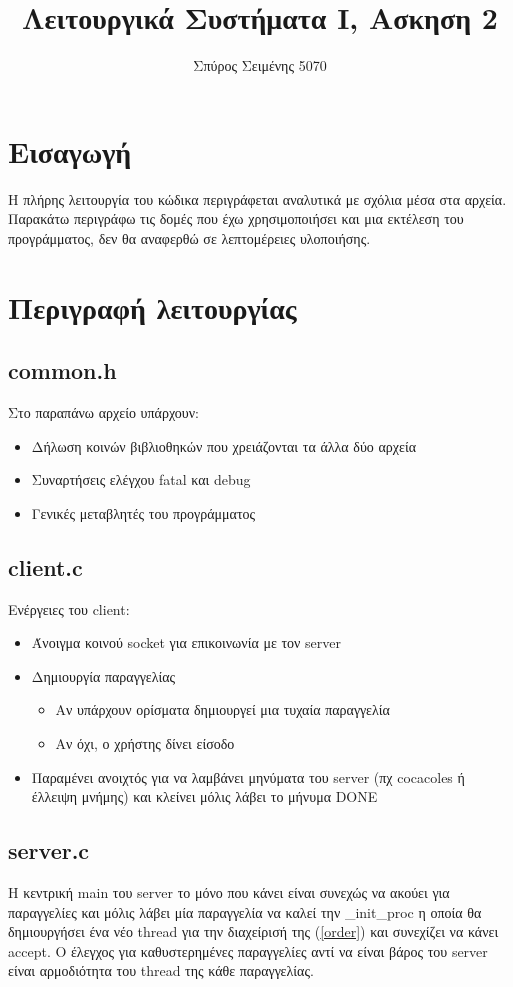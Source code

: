 \documentclass{article}
\title{Λειτουργικά Συστήματα Ι, Ασκηση 2}
\author{Σπύρος Σειμένης 5070}
\begin{document}
\maketitle

\section{Εισαγωγή}
Η πλήρης λειτουργία του κώδικα περιγράφεται αναλυτικά με σχόλια μέσα στα αρχεία. Παρακάτω περιγράφω τις δομές που έχω χρησιμοποιήσει και μια εκτέλεση του προγράμματος, δεν θα αναφερθώ σε λεπτομέρειες υλοποιήσης.

\section{Περιγραφή λειτουργίας}
\subsection{common.h}
Στο παραπάνω αρχείο υπάρχουν:
\begin{itemize}
 \item Δήλωση κοινών βιβλιοθηκών που χρειάζονται τα άλλα δύο αρχεία
 \item Συναρτήσεις ελέγχου fatal και debug
 \item Γενικές μεταβλητές του προγράμματος
\end{itemize}

\subsection{client.c}
Ενέργειες του client:
\begin{itemize}
 \item Άνοιγμα κοινού socket για επικοινωνία με τον server
 \item Δημιουργία παραγγελίας
 \begin{itemize}
 \item Αν υπάρχουν ορίσματα δημιουργεί μια τυχαία παραγγελία
 \item Αν όχι, ο χρήστης δίνει είσοδο
 \end{itemize}
 \item Παραμένει ανοιχτός για να λαμβάνει μηνύματα του server (πχ cocacoles ή έλλειψη μνήμης) και κλείνει μόλις λάβει το μήνυμα DONE 
\end{itemize}
\pagebreak
\subsection{server.c}
Η κεντρική main του server το μόνο που κάνει είναι συνεχώς να ακούει για παραγγελίες και μόλις λάβει μία παραγγελία να καλεί την \_init\_proc η οποία θα δημιουργήσει ένα νέο thread για την διαχείρισή της (\ref{order}) και συνεχίζει να κάνει accept. Ο έλεγχος για καθυστερημένες παραγγελίες αντί να είναι βάρος του server είναι αρμοδιότητα του thread της κάθε παραγγελίας.
\end{document}
